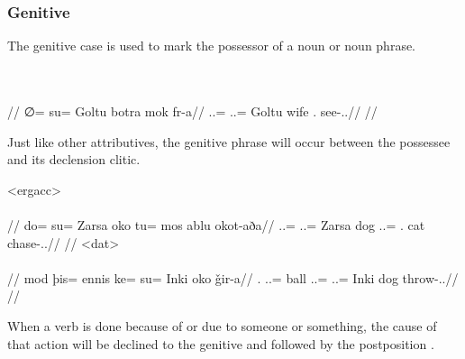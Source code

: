 \subsubsection{Genitive}
\label{subsubsec:tvk-nouns-genitive}

The genitive case is used to mark the possessor of a noun or noun phrase.

	\begingl
		\glpreamble{}\\
		\\
		//
		\gla ∅= su= Goltu botra mok fr-a//
		\glb \An.\Sg.\Abs= \An.\Sg.\Gen= Goltu wife \Fps.\Dat{} see-\Ind.\Npst.\Ipfv//
		\glft{}//
	\endgl
\xe

Just like other attributives, the genitive phrase will occur between the possessee and its declension clitic.

	\a<ergacc>\begingl
		\glpreamble{}\\
		\\
		//
		\gla do= su= Zarsa oko tu= mos ablu okot-aða//
		\glb \An.\Sg.\Erg= \An.\Sg.\Gen= Zarsa dog \An.\Sg.\Acc= \Fps.\Gen{} cat chase-\Ind.\Pst.\Prg//
		\glft{}//
	\endgl
	\a<dat>\begingl
		\glpreamble{}\\
		\\
		//
		\gla mod þis= ennis ke= su= Inki oko ǧir-a//
		\glb \Fps.\Erg{} \In.\Sg.\Acc= ball \An.\Sg.\Dat= \An.\Sg.\Gen= Inki dog throw-\Ind.\Npst.\Ipfv//
		\glft{}//
	\endgl
\xe

When a verb is done because of or due to someone or something, the cause of that action will be declined to the genitive and followed by the postposition    .

